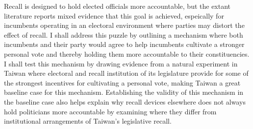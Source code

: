 \documentclass[hyphens, crop=false]{standalone}
\begin{document}
	
	Recall is designed to hold elected officials more accountable,
	but the extant literature reports mixed evidence that this goal is achieved,
	espeically for incumbents operating in an electoral environment where parties may distort the effect of recall.
	I shall address this puzzle
	by outlining a mechanism where both incumbents and their party would
	agree to help incumbents cultivate a stronger personal vote and thereby holding them more accountable to their constituencies.
	I shall test this mechanism by drawing evidence from a natural experiment in Taiwan where
	electoral and recall institution of its legislature provide for some of the strongest incentives for cultivating a personal vote,
	making Taiwan a great baseline case for this mechanism.
	Establishing the validity of this mechanism in the baseline case also helps
	explain why recall devices elsewhere does not always hold politicians more accountable
	by examining where they differ from institutional arrangements of Taiwan's legislative recall.
	
	
	
\end{document}
